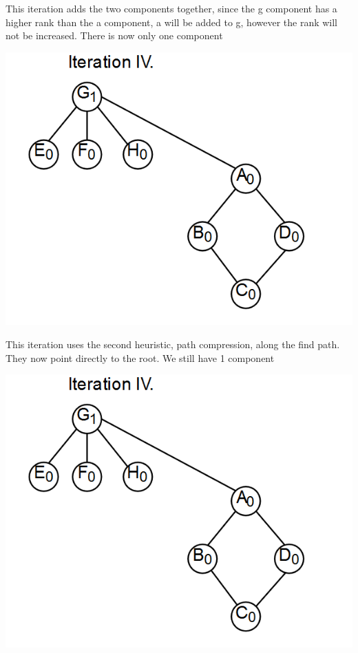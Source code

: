 \documentclass[10pt,a4paper]{article}
\begin{document}
This iteration adds the two components together, since the g component has a higher rank than the a component, a will be added to g, however the rank will not be increased. There is now only one component

	\includegraphics[scale = .5]{boi4.PNG}

This iteration uses the second heuristic, path compression, along the find path. They now point directly to the root. We still have 1 component

	\includegraphics[scale = .5]{boi4.PNG}
\end{document}

